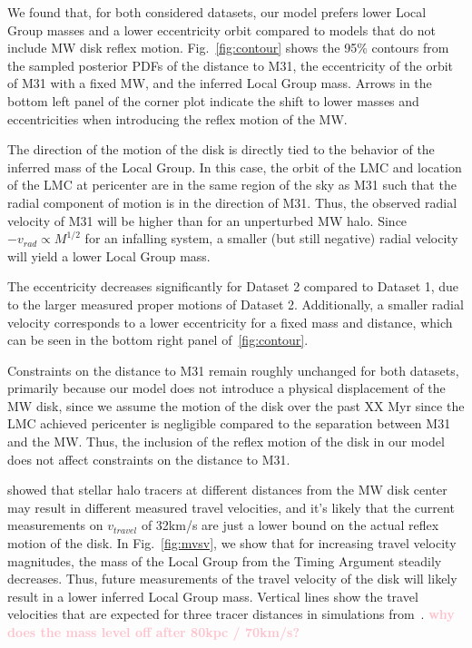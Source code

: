 \documentclass[twocolumn]{aastex631}
\newcommand{\kc}[1]{\textcolor{pink}{\textbf{#1}} }
\begin{document}
We found that, for both considered datasets, our model prefers lower Local Group masses and a lower eccentricity orbit compared to models that do not include MW disk reflex motion. Fig.~\ref{fig:contour} shows the 95\% contours from the sampled posterior PDFs of the distance to M31, the eccentricity of the orbit of M31 with a fixed MW, and the inferred Local Group mass. Arrows in the bottom left panel of the corner plot indicate the shift to lower masses and eccentricities when introducing the reflex motion of the MW.

The direction of the motion of the disk is directly tied to the behavior of the inferred mass of the Local Group. In this case, the orbit of the LMC and location of the LMC at pericenter are in the same region of the sky as M31 such that the radial component of motion is in the direction of M31. Thus, the observed radial velocity of M31 will be higher than for an unperturbed MW halo. Since $-v_{rad}\propto M^{1/2}$ for an infalling system, a smaller (but still negative) radial velocity will yield a lower Local Group mass.

The eccentricity decreases significantly for Dataset 2 compared to Dataset 1, due to the larger measured proper motions of Dataset 2.  Additionally, a smaller radial velocity corresponds to a lower eccentricity for a fixed mass and distance, which can be seen in the bottom right panel of~\ref{fig:contour}.

Constraints on the distance to M31 remain roughly unchanged for both datasets, primarily because our model does not introduce a physical displacement of the MW disk, since we assume the motion of the disk over the past XX Myr since the LMC achieved pericenter is negligible compared to the separation between M31 and the MW. Thus, the inclusion of the reflex motion of the disk in our model does not affect constraints on the distance to M31.


\cite{Garavito-Camargo2021b} showed that stellar halo tracers at different distances from the MW disk center may result in different measured travel velocities, and it's likely that the current measurements on $v_{travel}$ of 32km/s are just a lower bound on the actual reflex motion of the disk. In Fig.~\ref{fig:mvsv}, we show that for increasing travel velocity magnitudes, the mass of the Local Group from the Timing Argument steadily decreases. Thus, future measurements of the travel velocity of the disk will likely result in a lower inferred Local Group mass. Vertical lines show the travel velocities that are expected for three tracer distances in simulations from~\cite{Garavito-Camargo2021b}. \kc{why does the mass level off after 80kpc / 70km/s? }
\end{document}
